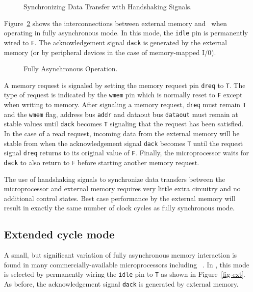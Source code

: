 \begin{figure}
\begin{center}


\caption{Synchronizing Data Transfer with Handshaking Signals.}
\label{fig-hand}
\end{center}
\end{figure}

Figure~\ref{fig-asyn} shows the interconnections between
external memory and \Tamarack\
when operating in fully asynchronous mode.
In this mode, the \verb"idle" pin is permanently wired to \verb"F".
The acknowledgement signal
\verb"dack" is generated by the external memory (or by peripheral devices
in the case of memory-mapped I/0).

\begin{figure}
\begin{center}


\caption{Fully Asynchronous Operation.}
\label{fig-asyn}
\end{center}
\end{figure}

A memory request is signaled by setting the memory request pin \verb"dreq"
to \verb"T".
The type of request is indicated by the \verb"wmem" pin which is
normally reset to \verb"F" except when writing to memory.
After signaling a memory request,
\verb"dreq" must remain \verb"T" and
the \verb"wmem" flag,
address bus \verb"addr" and dataout bus \verb"dataout" must
remain at stable values
until \verb"dack" becomes \verb"T" signaling
that the request has been satisfied.
In the case of a read request,
incoming data from the external memory will
be stable from when the acknowledgement signal \verb"dack" becomes
\verb"T" until the request signal \verb"dreq" returns to its
original value of \verb"F".
Finally, the microprocessor waits for \verb"dack" to also return to
\verb"F" before starting another memory request.

The use of handshaking signals to synchronize data transfers
between the microprocessor and external memory
requires very little extra circuitry
and no additional control states.
Best case performance by the external memory will
result in exactly the same number of clock cycles as fully
synchronous mode.

\subsection{Extended cycle mode}

A small, but significant variation of fully asynchronous memory
interaction is found in many commercially-available microprocessors
including \Viper\ \cite{Pygott84}.
In \Tamarack, this mode is selected by permanently
wiring the \verb"idle" pin to \verb"T" as shown in Figure~\ref{fig-ext}.
As before,
the acknowledgement signal \verb"dack" is generated by external memory.

